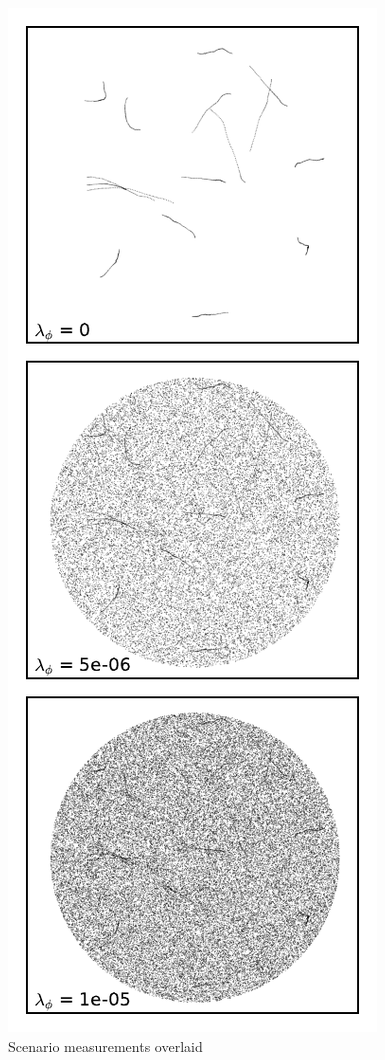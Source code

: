 \begin{figure}
 \centering
 \includegraphics{Figures/plots/ScenarioOverlaid}
 \caption{Scenario measurements overlaid}\label{fig:measurements_overlaid}
\end{figure}

